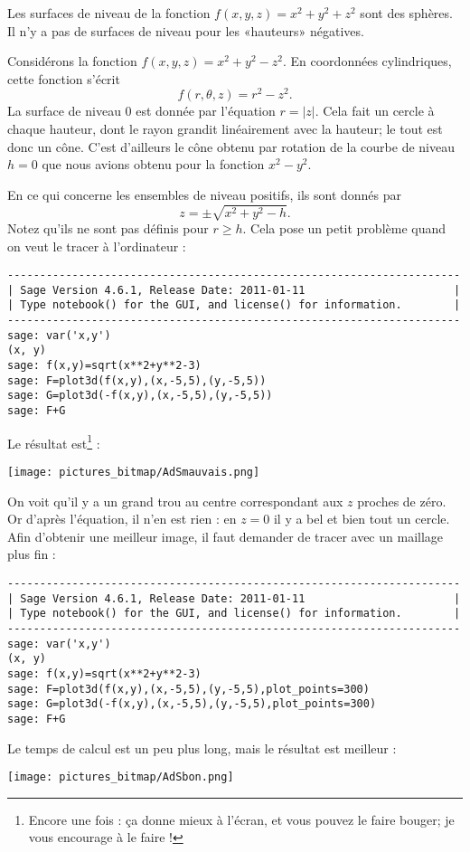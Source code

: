 \begin{example}
    Les surfaces de niveau de la fonction $f(x,y,z)=x^2+y^2+z^2$ sont des sphères. Il n'y a pas de surfaces de niveau pour les «hauteurs» négatives.
\end{example}

\begin{example}
    Considérons la fonction $f(x,y,z)=x^2+y^2-z^2$. En coordonnées cylindriques, cette fonction s'écrit
    \begin{equation}
        f(r,\theta,z)=r^2-z^2.
    \end{equation}
    La surface de niveau $0$ est donnée par l'équation $r=| z |$. Cela fait un cercle à chaque hauteur, dont le rayon grandit linéairement avec la hauteur; le tout est donc un cône. C'est d'ailleurs le cône obtenu par rotation de la courbe de niveau $h=0$ que nous avions obtenu pour la fonction $x^2-y^2$.

    En ce qui concerne les ensembles de niveau positifs, ils sont donnés par
    \begin{equation}
        z=\pm\sqrt{x^2+y^2-h}.
    \end{equation}
    Notez qu'ils ne sont pas définis pour $r\geq h$. Cela pose un petit problème quand on veut le tracer à l'ordinateur :
    \begin{verbatim}
----------------------------------------------------------------------
| Sage Version 4.6.1, Release Date: 2011-01-11                       |
| Type notebook() for the GUI, and license() for information.        |
----------------------------------------------------------------------
sage: var('x,y')
(x, y)
sage: f(x,y)=sqrt(x**2+y**2-3)
sage: F=plot3d(f(x,y),(x,-5,5),(y,-5,5))
sage: G=plot3d(-f(x,y),(x,-5,5),(y,-5,5))
sage: F+G
    \end{verbatim}
Le résultat est\footnote{Encore une fois : ça donne mieux à l'écran, et vous pouvez le faire bouger; je vous encourage à le faire !} :
    \begin{center}
            \texttt{[image: pictures\_bitmap/AdSmauvais.png]}
    \end{center}
    On voit qu'il y a un grand trou au centre correspondant aux $z$ proches de zéro. Or d'après l'équation, il n'en est rien : en $z=0$ il y a bel et bien tout un cercle. Afin d'obtenir une meilleur image, il faut demander de tracer avec un maillage plus fin :
    \begin{verbatim}
----------------------------------------------------------------------
| Sage Version 4.6.1, Release Date: 2011-01-11                       |
| Type notebook() for the GUI, and license() for information.        |
----------------------------------------------------------------------
sage: var('x,y')
(x, y)
sage: f(x,y)=sqrt(x**2+y**2-3)
sage: F=plot3d(f(x,y),(x,-5,5),(y,-5,5),plot_points=300)
sage: G=plot3d(-f(x,y),(x,-5,5),(y,-5,5),plot_points=300)
sage: F+G
    \end{verbatim}
    Le temps de calcul est un peu plus long, mais le résultat est meilleur :
    \begin{center}
            \texttt{[image: pictures\_bitmap/AdSbon.png]}
    \end{center}
\end{example}

